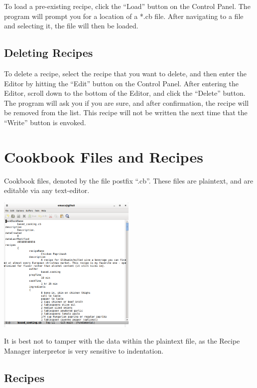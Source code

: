\documentclass{article}
\begin{document}
To load a pre-existing recipe, click the ``Load'' button on the
Control Panel. The program will prompt you for a location of a *.cb
file. After navigating to a file and selecting it, the file will then
be loaded.

\subsection{Deleting Recipes}

To delete a recipe, select the recipe that you want to delete, and
then enter the Editor by hitting the ``Edit'' button on the Control
Panel. After entering the Editor, scroll down to the bottom of the
Editor, and click the ``Delete'' button. The program will ask you if
you are sure, and after confirmation, the recipe will be removed from
the list. This recipe will not be written the next time that the
``Write'' button is envoked. 

\section{Cookbook Files and Recipes\label{cbr}}

Cookbook files, denoted by the file postfix ``.cb''. These files are
plaintext, and are editable via any text-editor. 

\begin{center}
\includegraphics[width=250px]{img/emac.png}
\end{center}

It is best not to tamper with the data within the plaintext file, as
the Recipe Manager interpretor is very sensitive to indentation.

\subsection{Recipes}
\end{document}
